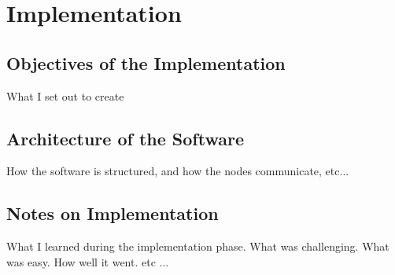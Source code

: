 
\chapter{Implementation}
\label{ch:sw}

\section{Objectives of the Implementation}
\label{ch:sw:objectives}

What I set out to create

\section{Architecture of the Software}
\label{ch:sw:architecture}

How the software is structured, and how the nodes communicate, etc...

\section{Notes on Implementation}
\label{ch:sw:notes}

What I learned during the implementation phase. What was challenging.
What was easy. How well it went. etc ...
